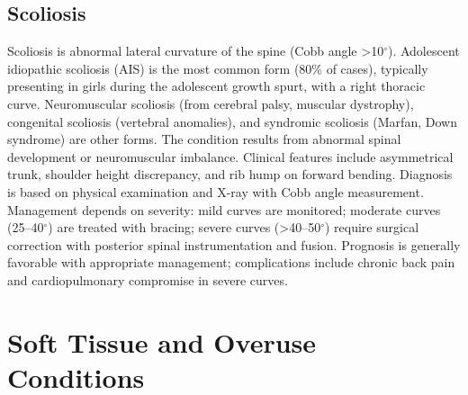 \subsection{Scoliosis}
\label{sec:Scoliosis}
Scoliosis is abnormal lateral curvature of the spine (Cobb angle >10$^\circ$). Adolescent idiopathic scoliosis (AIS) is the most common form (80\% of cases), typically presenting in girls during the adolescent growth spurt, with a right thoracic curve. Neuromuscular scoliosis (from cerebral palsy, muscular dystrophy), congenital scoliosis (vertebral anomalies), and syndromic scoliosis (Marfan, Down syndrome) are other forms. The condition results from abnormal spinal development or neuromuscular imbalance. Clinical features include asymmetrical trunk, shoulder height discrepancy, and rib hump on forward bending. Diagnosis is based on physical examination and X-ray with Cobb angle measurement. Management depends on severity: mild curves are monitored; moderate curves (25--40$^\circ$) are treated with bracing; severe curves (>40--50$^\circ$) require surgical correction with posterior spinal instrumentation and fusion. Prognosis is generally favorable with appropriate management; complications include chronic back pain and cardiopulmonary compromise in severe curves.

\section{Soft Tissue and Overuse Conditions}








\label{sec:Soft Tissue and Overuse Conditions}

